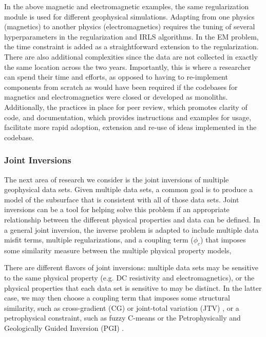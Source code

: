 

In the above magnetic and electromagnetic examples, the same regularization module is used for different geophysical simulations. Adapting from one physics (magnetics) to another physics (electromagnetics) requires the tuning of several hyperparameters in the regularization and IRLS algorithms. In the EM problem, the time constraint is added as a straightforward extension to the regularization. There are also additional complexities since the data are not collected in exactly the same location across the two years. Importantly, this is where a researcher can spend their time and efforts, as opposed to having to re-implement components from scratch as would have been required if the codebases for magnetics and electromagnetics were closed or developed as monoliths. Additionally, the practices in place for peer review, which promotes clarity of code, and documentation, which provides instructions and examples for usage, facilitate more rapid adoption, extension and re-use of ideas implemented in the codebase.



\subsubsection{Joint Inversions}

The next area of research we consider is the joint inversions of multiple geophysical data sets. Given multiple data sets, a common goal is to produce a model of the subsurface that is consistent with all of those data sets. Joint inversions can be a tool for helping solve this problem if an appropriate relationship between the different physical properties and data can be defined. In a general joint inversion, the inverse problem is adapted to include multiple data misfit terms, multiple regularizations, and a coupling term ($\phi_c$) that imposes some similarity measure between the multiple physical property models,




There are different flavors of joint inversions: multiple data sets may be sensitive to the same physical property (e.g. DC resistivity and electromagnetics), or the physical properties that each data set is sensitive to may be distinct. In the latter case, we may then choose a coupling term that imposes some structural similarity, such as cross-gradient (CG) or joint-total variation (JTV) \citep{Gallardo2003, Haber2013}, or a petrophysical constraint, such as fuzzy C-means \citep{Sun2016} or the Petrophysically and Geologically Guided Inversion (PGI) \citep{Astic2019}.

